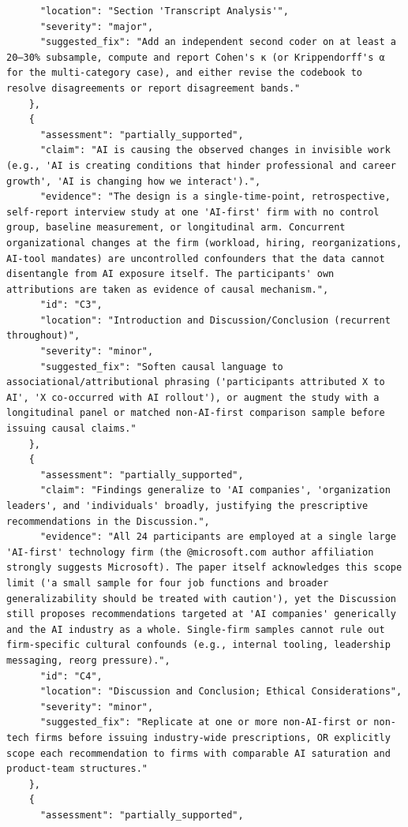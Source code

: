 \documentclass[11pt]{article}
\begin{document}
\begin{verbatim}
      "location": "Section 'Transcript Analysis'",
      "severity": "major",
      "suggested_fix": "Add an independent second coder on at least a 20–30% subsample, compute and report Cohen's κ (or Krippendorff's α for the multi-category case), and either revise the codebook to resolve disagreements or report disagreement bands."
    },
    {
      "assessment": "partially_supported",
      "claim": "AI is causing the observed changes in invisible work (e.g., 'AI is creating conditions that hinder professional and career growth', 'AI is changing how we interact').",
      "evidence": "The design is a single-time-point, retrospective, self-report interview study at one 'AI-first' firm with no control group, baseline measurement, or longitudinal arm. Concurrent organizational changes at the firm (workload, hiring, reorganizations, AI-tool mandates) are uncontrolled confounders that the data cannot disentangle from AI exposure itself. The participants' own attributions are taken as evidence of causal mechanism.",
      "id": "C3",
      "location": "Introduction and Discussion/Conclusion (recurrent throughout)",
      "severity": "minor",
      "suggested_fix": "Soften causal language to associational/attributional phrasing ('participants attributed X to AI', 'X co-occurred with AI rollout'), or augment the study with a longitudinal panel or matched non-AI-first comparison sample before issuing causal claims."
    },
    {
      "assessment": "partially_supported",
      "claim": "Findings generalize to 'AI companies', 'organization leaders', and 'individuals' broadly, justifying the prescriptive recommendations in the Discussion.",
      "evidence": "All 24 participants are employed at a single large 'AI-first' technology firm (the @microsoft.com author affiliation strongly suggests Microsoft). The paper itself acknowledges this scope limit ('a small sample for four job functions and broader generalizability should be treated with caution'), yet the Discussion still proposes recommendations targeted at 'AI companies' generically and the AI industry as a whole. Single-firm samples cannot rule out firm-specific cultural confounds (e.g., internal tooling, leadership messaging, reorg pressure).",
      "id": "C4",
      "location": "Discussion and Conclusion; Ethical Considerations",
      "severity": "minor",
      "suggested_fix": "Replicate at one or more non-AI-first or non-tech firms before issuing industry-wide prescriptions, OR explicitly scope each recommendation to firms with comparable AI saturation and product-team structures."
    },
    {
      "assessment": "partially_supported",

\end{verbatim}
\end{document}
